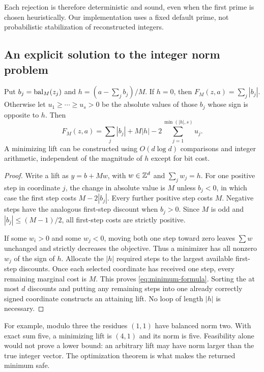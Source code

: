 Each rejection is therefore deterministic and sound, even when the first
prime is chosen heuristically. Our implementation uses a fixed default prime,
not probabilistic stabilization of reconstructed integers.

\subsection{An explicit solution to the integer norm problem}

\begin{theorem}
\label{thm:minimum}
Put $b_j=\operatorname{bal}_M(z_j)$ and $h=(a-\sum_jb_j)/M$. If $h=0$, then
$F_M(z,a)=\sum_j|b_j|$. Otherwise let $u_1\ge\cdots\ge u_s>0$ be the
absolute values of those $b_j$ whose sign is opposite to $h$. Then
\begin{equation}
 F_M(z,a)=\sum_j|b_j|+M|h|
                     -2\sum_{j=1}^{\min(|h|,s)}u_j.
 \label{eq:minimum-formula}
\end{equation}
A minimizing lift can be constructed using $O(d\log d)$ comparisons and
integer arithmetic, independent of the magnitude of $h$ except for bit cost.
\end{theorem}
\begin{proof}
Write a lift as $y=b+Mw$, with $w\in\mathbb Z^d$ and $\sum_jw_j=h$.
For one positive step in coordinate $j$, the change in absolute value is $M$
unless $b_j<0$, in which case the first step costs $M-2|b_j|$.
Every further positive step costs $M$. Negative steps have the analogous
first-step discount when $b_j>0$. Since $M$ is odd and $|b_j|\le(M-1)/2$,
all first-step costs are strictly positive.

If some $w_i>0$ and some $w_j<0$, moving both one step toward zero leaves
$\sum w$ unchanged and strictly decreases the objective. Thus a minimizer
has all nonzero $w_j$ of the sign of $h$. Allocate the $|h|$ required steps
to the largest available first-step discounts. Once each selected coordinate
has received one step, every remaining marginal cost is $M$. This proves
\cref{eq:minimum-formula}. Sorting the at most $d$ discounts and putting any
remaining steps into one already correctly signed coordinate constructs an
attaining lift. No loop of length $|h|$ is necessary.
\end{proof}

For example, modulo three the residues $(1,1)$ have balanced norm two.
With exact sum five, a minimizing lift is $(4,1)$ and its norm is five.
Feasibility alone would not prove a lower bound: an arbitrary lift may have
norm larger than the true integer vector. The optimization theorem is what
makes the returned minimum safe.

